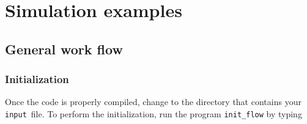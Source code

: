 \documentclass[12pt]{article}
\newcommand{\code}[1]{\texttt{#1}}
\newcommand{\inp}{\code{input}~}
\begin{document}
\section{Simulation examples}

\subsection{General work flow}


\subsubsection*{Initialization}
Once the code is properly compiled, change to the directory that contains your \inp file. To perform the initialization, run the program \code{init\_flow} by typing

\vspace{1em}
\vspace{1em}

\end{document}
